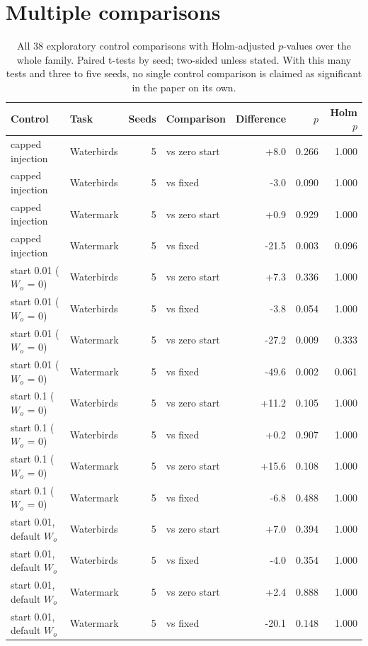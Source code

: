 \documentclass[10pt]{article}
\begin{document}
\section{Multiple comparisons}
\begin{longtable}{llrlrrr}
\caption{All 38 exploratory control comparisons with Holm-adjusted $p$-values over the whole family. Paired t-tests by seed; two-sided unless stated. With this many tests and three to five seeds, no single control comparison is claimed as significant in the paper on its own.}\label{tab:s-holm}\\
\toprule
Control & Task & Seeds & Comparison & Difference & $p$ & Holm $p$ \\ \midrule
\endhead
capped injection & Waterbirds & 5 & vs zero start & +8.0 & 0.266 & 1.000 \\
capped injection & Waterbirds & 5 & vs fixed & -3.0 & 0.090 & 1.000 \\
capped injection & Watermark & 5 & vs zero start & +0.9 & 0.929 & 1.000 \\
capped injection & Watermark & 5 & vs fixed & -21.5 & 0.003 & 0.096 \\
start 0.01 ($W_o$ = 0) & Waterbirds & 5 & vs zero start & +7.3 & 0.336 & 1.000 \\
start 0.01 ($W_o$ = 0) & Waterbirds & 5 & vs fixed & -3.8 & 0.054 & 1.000 \\
start 0.01 ($W_o$ = 0) & Watermark & 5 & vs zero start & -27.2 & 0.009 & 0.333 \\
start 0.01 ($W_o$ = 0) & Watermark & 5 & vs fixed & -49.6 & 0.002 & 0.061 \\
start 0.1 ($W_o$ = 0) & Waterbirds & 5 & vs zero start & +11.2 & 0.105 & 1.000 \\
start 0.1 ($W_o$ = 0) & Waterbirds & 5 & vs fixed & +0.2 & 0.907 & 1.000 \\
start 0.1 ($W_o$ = 0) & Watermark & 5 & vs zero start & +15.6 & 0.108 & 1.000 \\
start 0.1 ($W_o$ = 0) & Watermark & 5 & vs fixed & -6.8 & 0.488 & 1.000 \\
start 0.01, default $W_o$ & Waterbirds & 5 & vs zero start & +7.0 & 0.394 & 1.000 \\
start 0.01, default $W_o$ & Waterbirds & 5 & vs fixed & -4.0 & 0.354 & 1.000 \\
start 0.01, default $W_o$ & Watermark & 5 & vs zero start & +2.4 & 0.888 & 1.000 \\
start 0.01, default $W_o$ & Watermark & 5 & vs fixed & -20.1 & 0.148 & 1.000 \\

\end{longtable}
\end{document}
